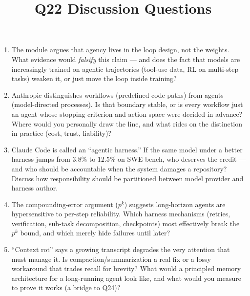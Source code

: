 \documentclass[11pt]{article}
\title{Q22 Discussion Questions}
\date{}
\begin{document}
\maketitle
\begin{enumerate}[noitemsep]
\item The module argues that agency lives in the loop design, not the weights. What evidence would \emph{falsify} this claim --- and does the fact that models are increasingly trained on agentic trajectories (tool-use data, RL on multi-step tasks) weaken it, or just move the loop inside training?
\item Anthropic distinguishes workflows (predefined code paths) from agents (model-directed processes). Is that boundary stable, or is every workflow just an agent whose stopping criterion and action space were decided in advance? Where would you personally draw the line, and what rides on the distinction in practice (cost, trust, liability)?
\item Claude Code is called an ``agentic harness.'' If the same model under a better harness jumps from 3.8\% to 12.5\% on SWE-bench, who deserves the credit --- and who should be accountable when the system damages a repository? Discuss how responsibility should be partitioned between model provider and harness author.
\item The compounding-error argument ($p^k$) suggests long-horizon agents are hypersensitive to per-step reliability. Which harness mechanisms (retries, verification, sub-task decomposition, checkpoints) most effectively break the $p^k$ bound, and which merely hide failures until later?
\item ``Context rot'' says a growing transcript degrades the very attention that must manage it. Is compaction/summarization a real fix or a lossy workaround that trades recall for brevity? What would a principled memory architecture for a long-running agent look like, and what would you measure to prove it works (a bridge to Q24)?
\end{enumerate}
\end{document}
